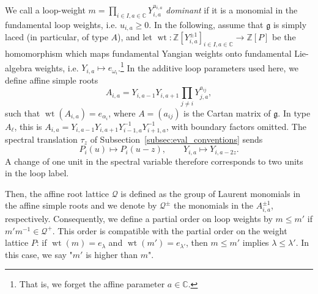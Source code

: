 \documentclass[12pt,reqno]{amsart}
\numberwithin{equation}{section}
\begin{document}
    We call a {loop}{-weight} $m = \prod_{i\in I, a\in\mathbb{C}}Y_{i,a}^{u_{i,a}}$ \textit{dominant} if it is a {monomial} in the {fundamental loop weights}, i.e. $u_{i,a}\geq 0$. In the following, assume that $\mathfrak{g}$ is {simply laced} (in particular, of type $A$), and let $\operatorname{wt}:\mathbb{Z}[Y_{i,a}^{\pm 1}]_{i\in I, a\in\mathbb{C}}\to \mathbb{Z}[P]$ be the homomorphism which maps fundamental Yangian weights onto fundamental Lie-algebra weights, i.e. $Y_{i,a}\mapsto e_{\omega_i}$.\footnote{That is, we forget the affine parameter $a\in\mathbb{C}$.} In the additive loop parameters used here, we define {affine simple roots}
		\begin{equation*}
			A_{i,a} = Y_{i,a-1}Y_{i,a+1}\prod_{j\neq i}Y^{a_{ij}}_{j,a},
		\end{equation*}
	such that $\operatorname{wt}(A_{i,a}) = e_{\alpha_i}$, where
    $A=(a_{ij})$ is the Cartan matrix of $\mathfrak{g}$.
    In type $A_\ell$, this is
    $A_{i,a}=Y_{i,a-1}Y_{i,a+1}Y_{i-1,a}^{-1}Y_{i+1,a}^{-1}$,
    with boundary factors omitted. The spectral translation $\tau_z$
    of Subsection~\ref{subsec:eval_conventions} sends
    \begin{equation}
        P_i(u)\longmapsto P_i(u-z),
        \qquad Y_{i,a}\longmapsto Y_{i,a-2z}.
        \label{eqn:loop_spectral_translation}
    \end{equation}
    A change of one unit in the spectral variable therefore corresponds
    to two units in the loop label.
	
	Then, the {affine root lattice} $\boldsymbol{\mathcal{Q}}$ is defined as the group of  {Laurent monomials in} the {affine simple roots} and we denote by $\boldsymbol{\mathcal{Q}^\pm}$ the  {monomials} in the $A_{i,a}^{\pm1}$, respectively.
	Consequently, we define a {partial order} on loop weights by $m\leq m'$ if $m'm^{-1}\in\mathcal{Q}^+$. This order is compatible with the partial order on the {weight lattice} $P$: if $\operatorname{wt}(m)=e_\lambda$ and $\operatorname{wt}(m')=e_{\lambda'}$, then $m\leq m'$ implies $\lambda\leq\lambda'$.
	In this case, we say "$m'$ {is} {higher than} $m$".
\end{document}
